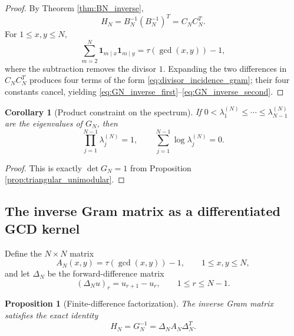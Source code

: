 \documentclass[11pt]{amsart}
\numberwithin{equation}{section}
\theoremstyle{plain}
\newtheorem{proposition}[theorem]{Proposition}
\newtheorem{corollary}[theorem]{Corollary}
\theoremstyle{definition}
\theoremstyle{remark}
\begin{document}
\begin{proof}
By Theorem \ref{thm:BN_inverse},
\begin{equation}
H_N=B_N^{-1}(B_N^{-1})^T=C_NC_N^T.
\end{equation}
For $1\le x,y\le N$,
\begin{equation}
\sum_{m=2}^{N}\mathbf 1_{m\mid x}\mathbf 1_{m\mid y}
=\tau(\gcd(x,y))-1,
\label{eq:divisor_incidence_gram}
\end{equation}
where the subtraction removes the divisor $1$.  Expanding the two differences in $C_NC_N^T$ produces four terms of the form \eqref{eq:divisor_incidence_gram}; their four constants cancel, yielding \eqref{eq:GN_inverse_first}--\eqref{eq:GN_inverse_second}.
\end{proof}

\begin{corollary}[Product constraint on the spectrum]
\label{cor:spectral_product}
If $0<\lambda_1^{(N)}\le\cdots\le\lambda_{N-1}^{(N)}$ are the eigenvalues of $G_N$, then
\begin{equation}
\prod_{j=1}^{N-1}\lambda_j^{(N)}=1,
\qquad
\sum_{j=1}^{N-1}\log\lambda_j^{(N)}=0.
\label{eq:spectral_product_one}
\end{equation}
\end{corollary}

\begin{proof}
This is exactly $\det G_N=1$ from Proposition \ref{prop:triangular_unimodular}.
\end{proof}

\subsection{The inverse Gram matrix as a differentiated GCD kernel}
\label{subsec:inverse_gcd_kernel}

Define the $N\times N$ matrix
\begin{equation}
A_N(x,y)=\tau(\gcd(x,y))-1,
\qquad 1\le x,y\le N,
\label{eq:gcd_kernel_A}
\end{equation}
and let $\Delta_N$ be the forward-difference matrix
\begin{equation}
(\Delta_Nu)_r=u_{r+1}-u_r,
\qquad 1\le r\le N-1.
\label{eq:forward_difference}
\end{equation}

\begin{proposition}[Finite-difference factorization]
\label{prop:finite_difference_factorization}
The inverse Gram matrix satisfies the exact identity
\begin{equation}
H_N=G_N^{-1}=\Delta_NA_N\Delta_N^T.
\label{eq:H_delta_A_delta}
\end{equation}
\end{proposition}
\end{document}
